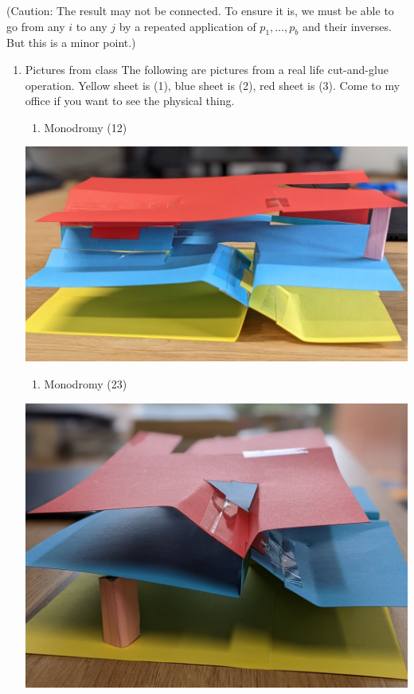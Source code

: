 \documentclass[11pt]{article}
\begin{document}
(Caution: The result may not be connected.  To ensure it is, we must be able to go from any \(i\) to any \(j\) by a repeated application of \(p_1, \dots, p_{b}\) and their inverses.  But this is a minor point.)
\begin{enumerate}
\item Pictures from class
\label{sec:org2f4ec82}
The following are pictures from a real life cut-and-glue operation.  Yellow sheet is (1), blue sheet is (2), red sheet is (3).  Come to my office if you want to see the physical thing.

\begin{enumerate}
\item Monodromy (12)
\end{enumerate}
\begin{center}
\includegraphics[width=.9\linewidth]{assets/Course_notes/2023-03-28_15-28-25_screenshot.png}
\end{center}

\begin{enumerate}
\item Monodromy (23)
\end{enumerate}

\begin{center}
\includegraphics[width=.9\linewidth]{assets/Course_notes/2023-03-28_15-27-51_screenshot.png}
\end{center}


\end{enumerate}
\end{document}
